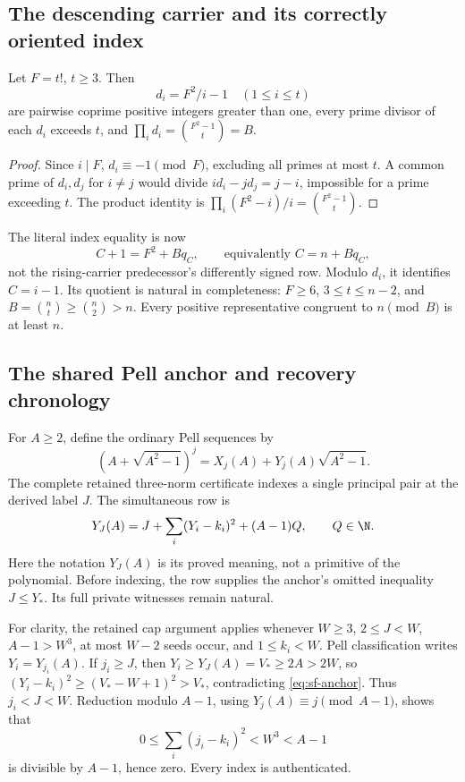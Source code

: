\subsection{The descending carrier and its correctly oriented index}
\begin{lemma}\label{lem:sf-crt}
Let \(F=t!\), \(t\ge3\). Then
\[
 d_i=F^2/i-1\quad(1\le i\le t)
\]
are pairwise coprime positive integers greater than one, every prime divisor
of each \(d_i\) exceeds \(t\), and
\(\prod_i d_i=\binom{F^2-1}{t}=B\).
\end{lemma}
\begin{proof}
Since \(i\mid F\), \(d_i\equiv-1\pmod F\), excluding all primes at
most \(t\). A common prime of \(d_i,d_j\) for \(i\ne j\) would divide
\(id_i-jd_j=j-i\), impossible for a prime exceeding \(t\).
The product identity is
\(\prod_i(F^2-i)/i=\binom{F^2-1}{t}\).
\end{proof}
The literal index equality is now
\begin{equation}\label{eq:sf-index}
 C+1=F^2+Bq_C,\qquad\text{equivalently } C=n+Bq_C,
\end{equation}
not the rising-carrier predecessor's differently signed row.
Modulo \(d_i\), it identifies \(C=i-1\).
Its quotient is natural in completeness: \(F\ge6\),
\(3\le t\le n-2\), and
\(B=\binom nt\ge\binom n2>n\). Every positive representative
congruent to \(n\pmod B\) is at least \(n\).

\subsection{The shared Pell anchor and recovery chronology}
For \(A\ge2\), define the ordinary Pell sequences by
\[
 (A+\sqrt{A^2-1})^j=X_j(A)+Y_j(A)\sqrt{A^2-1}.
\]
The complete retained three-norm certificate indexes a single principal
pair at the derived label \(J\). The simultaneous row is
\begin{equation}\label{eq:sf-anchor}
 Y_J(A)=J+\sum_i(Y_i-k_i)^2+(A-1)Q,\qquad Q\in\N.
\end{equation}
Here the notation \(Y_J(A)\) is its proved meaning, not a primitive of
the polynomial. Before indexing, the row supplies the anchor's omitted
inequality \(J\le Y_*\). Its full private witnesses remain natural.

For clarity, the retained cap argument applies whenever
\(W\ge3\), \(2\le J<W\), \(A-1>W^3\), at most \(W-2\)
seeds occur, and \(1\le k_i<W\).
Pell classification writes \(Y_i=Y_{j_i}(A)\). If \(j_i\ge J\),
then \(Y_i\ge Y_J(A)=V_*\ge2A>2W\), so
\((Y_i-k_i)^2\ge(V_*-W+1)^2>V_*\), contradicting
\eqref{eq:sf-anchor}. Thus \(j_i<J<W\). Reduction modulo \(A-1\),
using \(Y_j(A)\equiv j\pmod{A-1}\), shows that
\[
 0\le\sum_i(j_i-k_i)^2<W^3<A-1
\]
is divisible by \(A-1\), hence zero. Every index is authenticated.

